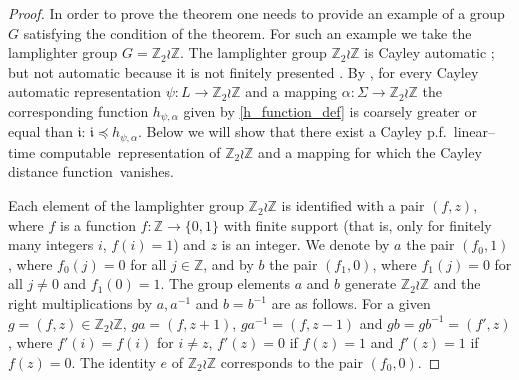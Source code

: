 \documentclass[article,12pt]{elsarticle}
\newcommand\distfun{Cayley distance function}
\newcommand\linearC{Cayley p.f.~linear--time computable}
\begin{document}
 \begin{proof} 
 	 In order to prove the theorem one needs to 
 	 provide an example of a group $G$ 
 	 satisfying the condition of the theorem. 
 	 For such an example we take the 
 	 lamplighter group $G=\mathbb{Z}_2 \wr \mathbb{Z}$.  
 	 The lamplighter group 
 	 $\mathbb{Z}_2 \wr \mathbb{Z}$ is Cayley automatic 
 	 \cite{KKM11}; but not automatic 
 	 because it is not finitely presented \cite{Epsteinbook}. 
 	 By \cite[Theorem~13]{BT_LATA18}, 
 	 for every Cayley automatic representation 
 	 $\psi : L \rightarrow \mathbb{Z}_2 \wr 
 	 \mathbb{Z}$ and a mapping 
 	 $\alpha : \Sigma \rightarrow 
 	 \mathbb{Z}_2 \wr \mathbb{Z}$ the 
 	 corresponding function $h_{\psi,\alpha}$ given by 
 	 \eqref{h_function_def} is coarsely greater 
 	 or equal than $\mathfrak{i}$: 
 	 $\mathfrak{i} \preceq h_{\psi,\alpha}$. 
 	 Below we will show that there exist 
 	 a \linearC\ representation of 
 	 $\mathbb{Z}_2 \wr \mathbb{Z}$ and 
 	 a mapping for which the \distfun\ vanishes. 
 	 
 	 Each element of the lamplighter group 
 	 $\mathbb{Z}_2 \wr \mathbb{Z}$ 
 	 is identified with a pair $(f,z)$, where 
 	 $f$ is a function 
 	 $f: \mathbb{Z} \rightarrow \{0,1\}$ with 
 	 finite support (that is, only for finitely many 
 	 integers $i$, $f(i) = 1$) and 
 	 $z$ is an integer. 
 	 We denote by $a$ the pair $(f_0,1)$, 
 	 where $f_0 (j) = 0$ for all 
 	 $j \in \mathbb{Z}$, and by $b$ the 
 	 pair $(f_1,0)$, where $f_1(j) = 0$ for 
 	 all $j \neq 0$ and $f_1(0)=1$.   
 	 The group elements $a$ and $b$ 
 	 generate  
 	 $\mathbb{Z}_2 \wr \mathbb{Z}$ and the right 
 	 multiplications by $a,a^{-1}$ and $b=b^{-1}$ 
 	 are as follows.
 	 For a given $g = (f,z) \in \mathbb{Z}_2 \wr \mathbb{Z}$, 
 	 $ga = (f, z+1)$, $ga^{-1} = (f,z-1)$ and  
 	 $g b = gb^{-1} =  (f',z)$, where $f' (i) = f(i)$ for 
 	 $i \neq z$, $f'(z) = 0 $ if 
 	 $f(z) = 1$ and $f'(z) = 1 $ if  
 	 $f(z) = 0$. 
 	 The identity $e$ of $\mathbb{Z}_2 \wr \mathbb{Z}$ 
 	 corresponds to the pair $(f_0,0)$.     
 	 

\end{proof}
\end{document}
